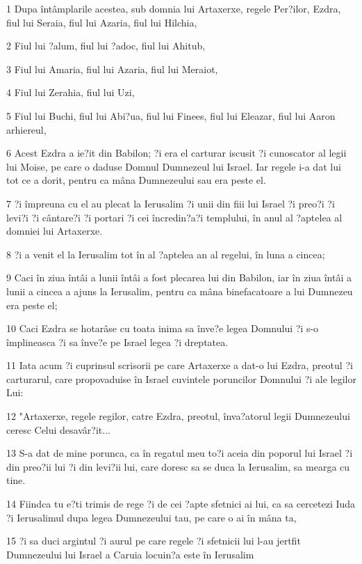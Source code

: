 \par 1 Dupa întâmplarile acestea, sub domnia lui Artaxerxe, regele Per?ilor, Ezdra, fiul lui Seraia, fiul lui Azaria, fiul lui Hilchia,
\par 2 Fiul lui ?alum, fiul lui ?adoc, fiul lui Ahitub,
\par 3 Fiul lui Amaria, fiul lui Azaria, fiul lui Meraiot,
\par 4 Fiul lui Zerahia, fiul lui Uzi,
\par 5 Fiul lui Buchi, fiul lui Abi?ua, fiul lui Finees, fiul lui Eleazar, fiul lui Aaron arhiereul,
\par 6 Acest Ezdra a ie?it din Babilon; ?i era el carturar iscusit ?i cunoscator al legii lui Moise, pe care o daduse Domnul Dumnezeul lui Israel. Iar regele i-a dat lui tot ce a dorit, pentru ca mâna Dumnezeului sau era peste el.
\par 7 ?i împreuna cu el au plecat la Ierusalim ?i unii din fiii lui Israel ?i preo?i ?i levi?i ?i cântare?i ?i portari ?i cei încredin?a?i templului, în anul al ?aptelea al domniei lui Artaxerxe.
\par 8 ?i a venit el la Ierusalim tot în al ?aptelea an al regelui, în luna a cincea;
\par 9 Caci în ziua întâi a lunii întâi a fost plecarea lui din Babilon, iar în ziua întâi a lunii a cincea a ajuns la Ierusalim, pentru ca mâna binefacatoare a lui Dumnezeu era peste el;
\par 10 Caci Ezdra se hotarâse cu toata inima sa înve?e legea Domnului ?i s-o împlineasca ?i sa înve?e pe Israel legea ?i dreptatea.
\par 11 Iata acum ?i cuprinsul scrisorii pe care Artaxerxe a dat-o lui Ezdra, preotul ?i carturarul, care propovaduise în Israel cuvintele poruncilor Domnului ?i ale legilor Lui:
\par 12 "Artaxerxe, regele regilor, catre Ezdra, preotul, înva?atorul legii Dumnezeului ceresc Celui desavâr?it...
\par 13 S-a dat de mine porunca, ca în regatul meu to?i aceia din poporul lui Israel ?i din preo?ii lui ?i din levi?ii lui, care doresc sa se duca la Ierusalim, sa mearga cu tine.
\par 14 Fiindca tu e?ti trimis de rege ?i de cei ?apte sfetnici ai lui, ca sa cercetezi Iuda ?i Ierusalimul dupa legea Dumnezeului tau, pe care o ai în mâna ta,
\par 15 ?i sa duci argintul ?i aurul pe care regele ?i sfetnicii lui l-au jertfit Dumnezeului lui Israel a Caruia locuin?a este în Ierusalim
